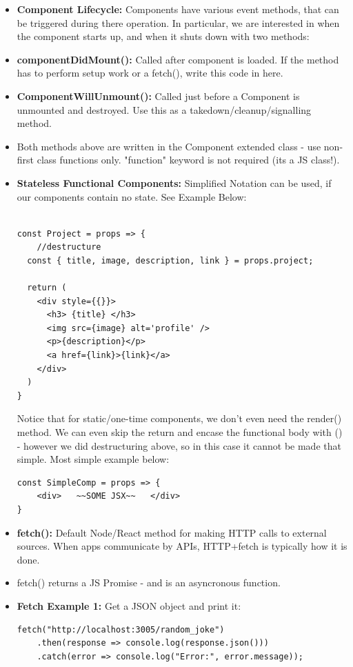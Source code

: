 \documentclass[8pt,a4paper]{extarticle}
\begin{document}
\begin{itemize}
\item \textbf{Component Lifecycle:} Components have various event methods, that can be triggered during there operation. In particular, we are interested in when the component starts up, and when it shuts down with two methods:
\item \textbf{componentDidMount():} Called after component is loaded. If the method has to perform setup work or a fetch(), write this code in here.
\item \textbf{ComponentWillUnmount():} Called just before a Component is unmounted and destroyed. Use this as a takedown/cleanup/signalling method.
\item Both methods above are written in the Component extended class - use non-first class functions only. "function" keyword is not required (its a JS class!).
\item \textbf{Stateless Functional Components:} Simplified Notation can be used, if our components contain no state. See Example Below:

\begin{verbatim}

const Project = props => {
	//destructure
  const { title, image, description, link } = props.project;
 
  return (
    <div style={{}}>
      <h3> {title} </h3>
      <img src={image} alt='profile' />
      <p>{description}</p>
      <a href={link}>{link}</a>
    </div>
  )
}
\end{verbatim}

Notice that for static/one-time components, we don't even need the render() method. We can even skip the return and encase the functional body with () - however we did destructuring above, so in this case it cannot be made that simple. Most simple example below:

\begin{verbatim}
const SimpleComp = props => {
	<div>   ~~SOME JSX~~   </div>
}
\end{verbatim}


\item \textbf{fetch():} Default Node/React method for making HTTP calls to external sources. When apps communicate by APIs, HTTP+fetch is typically how it is done.
\item fetch() returns a JS Promise - and is an asyncronous function.
\item \textbf{Fetch Example 1:} Get a JSON object and print it:
\begin{verbatim}
fetch("http://localhost:3005/random_joke")
    .then(response => console.log(response.json()))
    .catch(error => console.log("Error:", error.message));
\end{verbatim}


\end{itemize}
\end{document}
